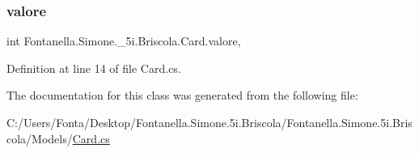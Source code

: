 \subsubsection{\texorpdfstring{valore}{valore}}
{\footnotesize\ttfamily int Fontanella.\+Simone.\+\_\+5i.\+Briscola.\+Card.\+valore\hspace{0.3cm}{\ttfamily [get]}, {\ttfamily [set]}}



Definition at line 14 of file Card.\+cs.



The documentation for this class was generated from the following file\+:\begin{DoxyCompactItemize}
\item 
C\+:/\+Users/\+Fonta/\+Desktop/\+Fontanella.\+Simone.\+5i.\+Briscola/\+Fontanella.\+Simone.\+5i.\+Briscola/\+Models/\hyperlink{_card_8cs}{Card.\+cs}\end{DoxyCompactItemize}
